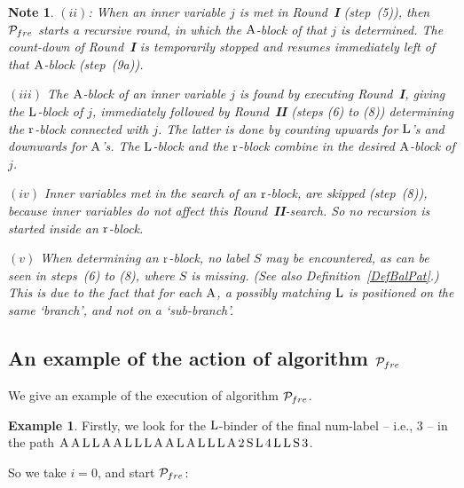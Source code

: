 \documentclass{article}
\theoremstyle{plain}
\newtheorem{Note}[The]{Note}
\theoremstyle{definition}
\newtheorem{Exa}[The]{Example}
\begin{document}
{\begin{Note}
$(ii)$: When an inner variable $j$ is met in Round~{\bf I} (step~(5)), then ${\cal P}_{fre}$ starts a recursive round, in which the ${\rm A}$-block of that $j$ is determined. The count-down of Round~{\bf I} is temporarily stopped and resumes immediately left of that ${\rm A}$-block (step~(9a)).

$(iii)$ The ${\rm A}$-block of an inner variable $j$ is found by executing Round~{\bf I}, giving the ${\rm L}$-block of $j$, immediately followed by Round~{\bf II} (steps (6) to (8)) determining the ${\rm r}$-block connected with $j$. The latter is done by counting upwards for ${\rm L}$'s and downwards for ${\rm A}$'s. The ${\rm L}$-block and the ${\rm r}$-block combine in the desired ${\rm A}$-block of $j$.


$(iv)$ Inner variables met in the search of an ${\rm r}$-block, are skipped (step~(8)), because inner variables do not affect this Round~{\bf II}-search. So no recursion is started inside an ${\rm r}$-block.

$(v)$ When determining an ${\rm r}$-block, no label $S$ may be encountered, as can be seen in steps~(6) to (8), where $S$ is missing. (See also Definition~\ref{DefBalPat}.) This is due to the fact that for each ${\rm A}$, a possibly matching ${\rm L}$ is positioned on the same `branch', and not on a `sub-branch'.

\end{Note}



\subsection{An example of the action of algorithm ${{\cal P}_{fre}}$}


We give an example of the execution of algorithm ${{\cal P}_{fre}}$.



\begin{Exa}\label{ExaProPat}
Firstly, we look for the ${\rm L}$-binder of the final num-label -- i.e., $3$ -- in the path ${\rm A \, A \, L \, L \, A \, A \, L \, L \, L \, A \, A \, L \, A \, L \, L \, L \, A \, 2 \, S \, L \, 4 \, L \, L \, S \, 3} $.

So we take $i = 0$,  and start ${\cal P}_{fre}$:


\end{Exa}}
\end{document}
